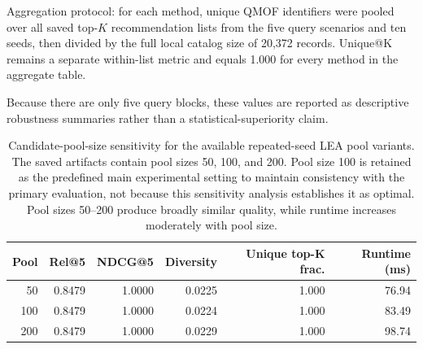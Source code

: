 \documentclass[12pt,a4paper]{article}
\begin{document}
Aggregation protocol: for each method, unique QMOF identifiers were pooled over all saved top-$K$ recommendation lists from the five query scenarios and ten seeds, then divided by the full local catalog size of 20{,}372 records. Unique@K remains a separate within-list metric and equals 1.000 for every method in the aggregate table.

\begin{table}[H]
\centering
\caption{Query-block LEA--WeightedSum hybrid material diversity differences. Values are query-level means over ten seeds.}
\label{tab:s_query_block_diversity}
\scriptsize
\setlength{\tabcolsep}{2pt}
\end{table}

Because there are only five query blocks, these values are reported as descriptive robustness summaries rather than a statistical-superiority claim.

\begin{table}[H]
\centering
\caption{Candidate-pool-size sensitivity for the available repeated-seed LEA pool variants. The saved artifacts contain pool sizes 50, 100, and 200. Pool size 100 is retained as the predefined main experimental setting to maintain consistency with the primary evaluation, not because this sensitivity analysis establishes it as optimal. Pool sizes 50--200 produce broadly similar quality, while runtime increases moderately with pool size.}
\small
\begin{tabular}{rrrrrr}
\toprule
\textbf{Pool} & \textbf{Rel@5} & \textbf{NDCG@5} & \textbf{Diversity} & \textbf{Unique top-K frac.} & \textbf{Runtime (ms)}\\
\midrule
50 & 0.8479 & 1.0000 & 0.0225 & 1.000 & 76.94\\
100 & 0.8479 & 1.0000 & 0.0224 & 1.000 & 83.49\\
200 & 0.8479 & 1.0000 & 0.0229 & 1.000 & 98.74\\
\bottomrule
\end{tabular}
\end{table}
\end{document}
